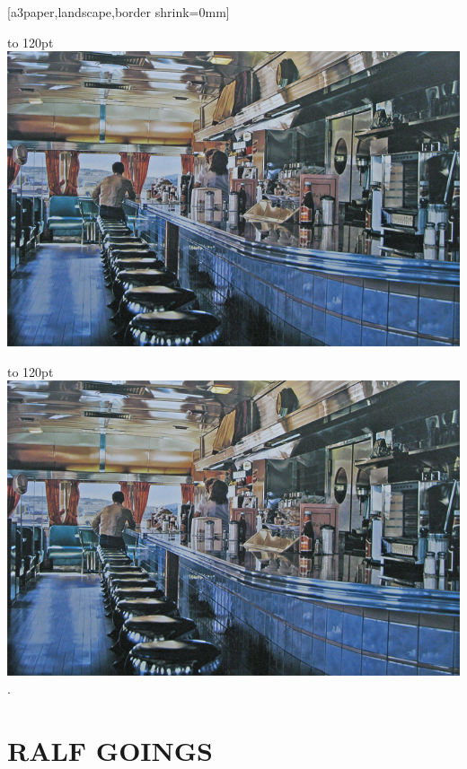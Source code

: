 \documentclass{book}
\makeatletter
\providecommand{\cleartoevenpage}[1][\@empty]{%
 \clearpage%
 \ifodd\c@page\null#1\clearpage\fi}
\makeatother
\begin{document}
\mainmatter
\null\newpage

[a3paper,landscape,border shrink=0mm]

\cleartoevenpage

\checkoddpage%
{%
\vbox to 120pt{\lipsum[1]}%
\includegraphics[height=0.8\textheight]{./images/ralf-goings}}%

{\parindent0pt
\vbox to 120pt{\lipsum[1]}%
\hspace*{\dimexpr(-2in-\textwidth-2\evensidemargin-3pt)}
\includegraphics[height=0.8\textheight]{./images/ralf-goings}}.
\hfill\parbox[b]{0.57\textwidth}{%
\section*{\hfill RALF GOINGS \hfill\hfill}%
\lipsum[1-3]}
\end{document}
